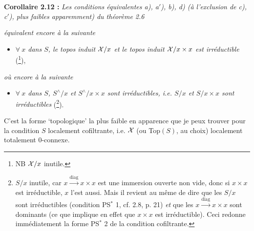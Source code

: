 \textbf{Corollaire 2.12 :} \textit{Les conditions équivalentes a), a$'$), b), d) (à l'exclusion de c), c$'$), plus faibles apparemment) du théorème 2.6}

\textit{équivalent encore à la suivante}
\begin{itemize}[leftmargin=2.5em]
\item[\textit{e)}] \textit{$\forall\ x$ dans $S$, le topos induit $\mathcal{X}/x$ et le topos induit $\mathcal{X}/x\times x$ est irréductible} (\footnote[37]{NB $\mathcal{X}/x$ inutile.}),
\end{itemize}
\textit{où encore à la suivante} %
\begin{itemize}[leftmargin=2.5em]
\item[\textit{e$'$)}] \textit{$\forall\ x$ dans $S$, $S^\wedge/x$ et $S^\wedge/x{\times}x$ sont irréductibles, i.e. $S/x$ et $S/x{\times}x$ sont irréductibles} (\footnote[38]{$S/x$ inutile, car $x\xrightarrow{\mathrm{diag}}x\times x$ est une immersion ouverte non vide, donc si $x\times x$ est irréductible, $x$ l'est aussi. Mais il revient au même de dire que les $S/x$ sont irréductibles (condition PS$^*$ 1, cf. 2.8, p. 21) \textit{et} que les $x\xrightarrow{\mathrm{diag}}x\times x$ sont dominants (ce que implique en effet que $x\times x$ est irréductible). Ceci redonne immédiatement la forme PS$^*$ 2 de la condition cofiltrante. %
}).
\end{itemize}
C'est la forme `topologique' la plus faible en apparence que je peux trouver pour la condition $S$ localement cofiltrante, i.e. $\mathcal{X}$ (ou Top$(S)$, au choix) localement totalement 0-connexe.

